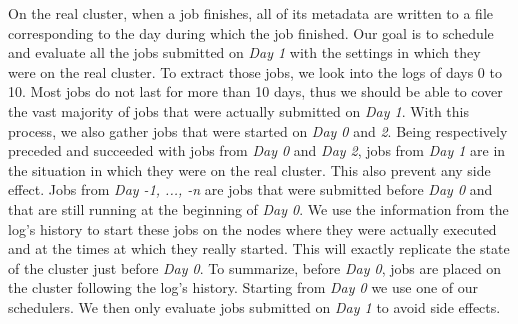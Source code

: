\documentclass[conference,10pt]{IEEEtran}
\newcommand{\file}{\ensuremath{\mathit{File}}\xspace}
\newcommand{\size}{\ensuremath{\mathit{Size}}\xspace}
\newcommand{\duration}{\mathit{Duration}\xspace}
\newcommand{\bandwidth}{\mathit{Bandwidth}\xspace}
\newcommand{\submissiontime}{\mathit{SubTime}\xspace}
\newcommand{\emptyflow}{\mathit{ReferenceFlow}\xspace}
\newcommand{\completiontime}{\mathit{CompletionTime}\xspace}
\begin{document}
On the real cluster, when a job finishes, all of its metadata
are written to a file corresponding to the day during which the job finished.
Our goal is to schedule and evaluate all the jobs submitted on 
\textit{Day 1} with the settings in which they were on the real cluster.
To extract those jobs, we
look into the logs of days 0 to 10. Most jobs do not last for more than 10 days,
thus we should be able to cover the vast majority of jobs that were actually submitted on 
\textit{Day 1}.
With this process, we also gather jobs that were started on \textit{Day 0} and \textit{2}. 
Being respectively preceded and succeeded with jobs from \textit{Day 0}
and \textit{Day 2}, jobs from \textit{Day 1} are in
the situation in which they were on the real cluster.
This also prevent any side effect.
Jobs from \textit{Day -1, ..., -n} are jobs that were submitted before \textit{Day 0} and that are still running at the beginning of \textit{Day 0}.
We use the information from the log's history to start these jobs on the nodes
where they were actually executed and at the times at which they really started.
This will exactly replicate the state of the cluster just before \textit{Day 0}.
To summarize, before \textit{Day 0}, jobs are placed on the cluster
following the log's history. Starting from \textit{Day 0} we 
use one of our schedulers. We then only evaluate jobs submitted on \textit{Day 1}
to avoid side effects.







\end{document}
